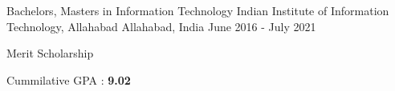 \documentclass[11pt, a4paper]{awesome-cv} %
\begin{document}
\makecvheader %



\begin{cventries}

  \cventry
    {Bachelors, Masters in Information Technology} %
    {Indian Institute of Information Technology, Allahabad} %
    {Allahabad, India} %
    {June 2016 - July 2021} %
    {
      \begin{cvitems} %
        \item{Merit Scholarship}
        \item{Cummilative GPA : \textbf{9.02}}
      \end{cvitems}
    }

\end{cventries}



\end{document}
